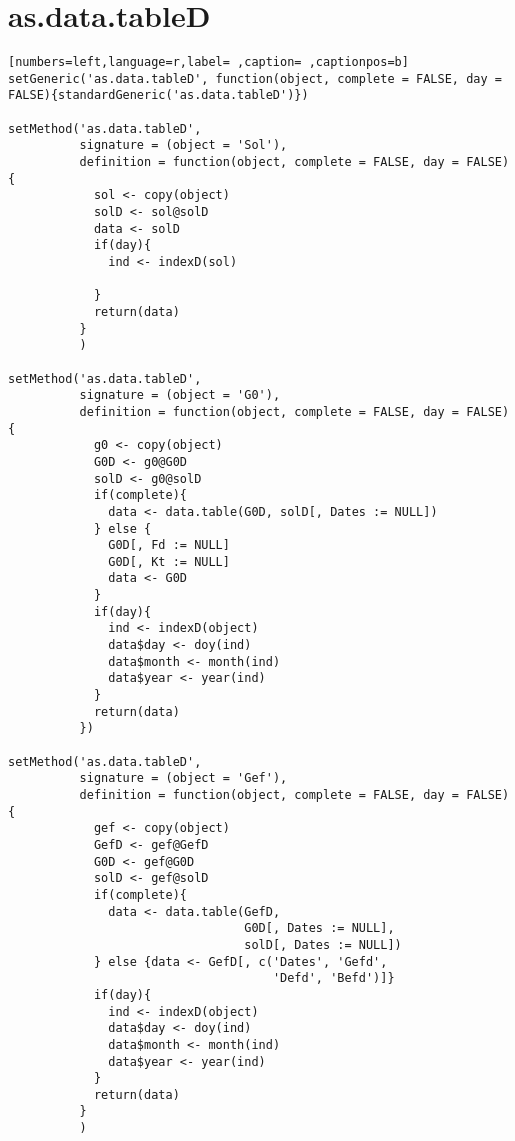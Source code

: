 \section{as.data.tableD}
\label{sec:orgad579a7}
\begin{lstlisting}[numbers=left,language=r,label= ,caption= ,captionpos=b]
setGeneric('as.data.tableD', function(object, complete = FALSE, day = FALSE){standardGeneric('as.data.tableD')})

setMethod('as.data.tableD',
          signature = (object = 'Sol'),
          definition = function(object, complete = FALSE, day = FALSE){
            sol <- copy(object)
            solD <- sol@solD
            data <- solD
            if(day){
              ind <- indexD(sol)
              
            }
            return(data)
          }
          )

setMethod('as.data.tableD',
          signature = (object = 'G0'),
          definition = function(object, complete = FALSE, day = FALSE){
            g0 <- copy(object)
            G0D <- g0@G0D
            solD <- g0@solD
            if(complete){
              data <- data.table(G0D, solD[, Dates := NULL])
            } else {
              G0D[, Fd := NULL]
              G0D[, Kt := NULL]
              data <- G0D
            }
            if(day){
              ind <- indexD(object)
              data$day <- doy(ind)
              data$month <- month(ind)
              data$year <- year(ind)
            }
            return(data)
          })

setMethod('as.data.tableD',
          signature = (object = 'Gef'),
          definition = function(object, complete = FALSE, day = FALSE){
            gef <- copy(object)
            GefD <- gef@GefD
            G0D <- gef@G0D
            solD <- gef@solD
            if(complete){
              data <- data.table(GefD,
                                 G0D[, Dates := NULL],
                                 solD[, Dates := NULL])
            } else {data <- GefD[, c('Dates', 'Gefd',
                                     'Defd', 'Befd')]}
            if(day){
              ind <- indexD(object)
              data$day <- doy(ind)
              data$month <- month(ind)
              data$year <- year(ind)
            }
            return(data)
          }
          )


\end{lstlisting}
